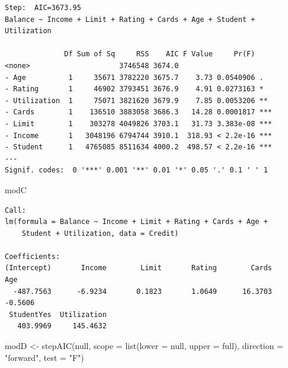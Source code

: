 \documentclass[
]{article}
\newenvironment{Shaded}{\begin{snugshade}}{\end{snugshade}}
\newcommand{\AttributeTok}[1]{\textcolor[rgb]{0.77,0.63,0.00}{#1}}
\newcommand{\FunctionTok}[1]{\textcolor[rgb]{0.00,0.00,0.00}{#1}}
\newcommand{\NormalTok}[1]{#1}
\newcommand{\OtherTok}[1]{\textcolor[rgb]{0.56,0.35,0.01}{#1}}
\newcommand{\StringTok}[1]{\textcolor[rgb]{0.31,0.60,0.02}{#1}}
\begin{document}
\begin{verbatim}
Step:  AIC=3673.95
Balance ~ Income + Limit + Rating + Cards + Age + Student + Utilization

              Df Sum of Sq     RSS    AIC F Value     Pr(F)    
<none>                     3746548 3674.0                      
- Age          1     35671 3782220 3675.7    3.73 0.0540906 .  
- Rating       1     46902 3793451 3676.9    4.91 0.0273163 *  
- Utilization  1     75071 3821620 3679.9    7.85 0.0053206 ** 
- Cards        1    136510 3883058 3686.3   14.28 0.0001817 ***
- Limit        1    303278 4049826 3703.1   31.73 3.383e-08 ***
- Income       1   3048196 6794744 3910.1  318.93 < 2.2e-16 ***
- Student      1   4765085 8511634 4000.2  498.57 < 2.2e-16 ***
---
Signif. codes:  0 '***' 0.001 '**' 0.01 '*' 0.05 '.' 0.1 ' ' 1
\end{verbatim}

\begin{Shaded}
\begin{Highlighting}[]
\NormalTok{modC}
\end{Highlighting}
\end{Shaded}

\begin{verbatim}
Call:
lm(formula = Balance ~ Income + Limit + Rating + Cards + Age + 
    Student + Utilization, data = Credit)

Coefficients:
(Intercept)       Income        Limit       Rating        Cards          Age  
  -487.7563      -6.9234       0.1823       1.0649      16.3703      -0.5606  
 StudentYes  Utilization  
   403.9969     145.4632  
\end{verbatim}

\begin{Shaded}
\begin{Highlighting}[]
\NormalTok{modD }\OtherTok{\textless{}{-}} \FunctionTok{stepAIC}\NormalTok{(null, }\AttributeTok{scope =} \FunctionTok{list}\NormalTok{(}\AttributeTok{lower =}\NormalTok{ null, }\AttributeTok{upper =}\NormalTok{ full), }\AttributeTok{direction =} \StringTok{"forward"}\NormalTok{, }\AttributeTok{test =} \StringTok{"F"}\NormalTok{)}
\end{Highlighting}
\end{Shaded}
\end{document}
